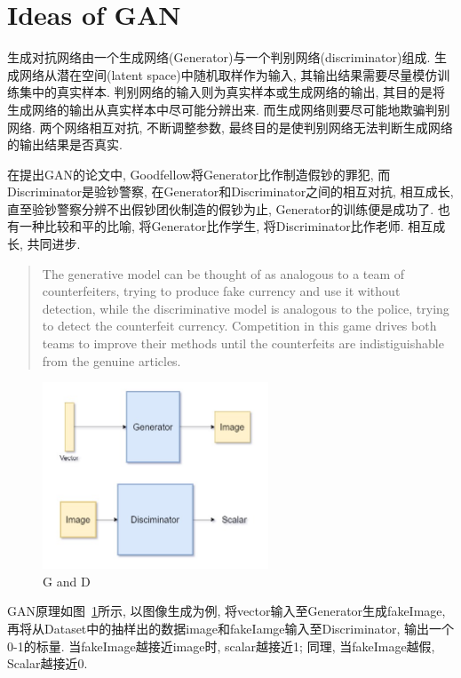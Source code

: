 \section{Ideas of GAN}
生成对抗网络由一个生成网络(Generator)与一个判别网络(discriminator)组成. 生成网络从潜在空间(latent space)中随机取样作为输入, 其输出结果需要尽量模仿训练集中的真实样本. 判别网络的输入则为真实样本或生成网络的输出, 其目的是将生成网络的输出从真实样本中尽可能分辨出来. 而生成网络则要尽可能地欺骗判别网络. 两个网络相互对抗, 不断调整参数, 最终目的是使判别网络无法判断生成网络的输出结果是否真实. 

在提出GAN的论文中, Goodfellow将Generator比作制造假钞的罪犯, 而Discriminator是验钞警察, 在Generator和Discriminator之间的相互对抗, 相互成长, 直至验钞警察分辨不出假钞团伙制造的假钞为止, Generator的训练便是成功了. 也有一种比较和平的比喻, 将Generator比作学生, 将Discriminator比作老师. 相互成长, 共同进步.
\begin{quotation}
    The generative model can be thought of as analogous to a team of counterfeiters, trying to produce fake currency and use it without detection, while the discriminative model is analogous to the police, trying to detect the counterfeit currency. Competition in this game drives both teams to improve their methods until the counterfeits are indistiguishable from the genuine articles.
\end{quotation}

\begin{figure}[!htbp]
    \centering
    \includegraphics[height=15em]{pic/pic0201.jpg}
    \caption{G and D}
    \label{fig:0201}
\end{figure}
GAN原理如图~\ref{fig:0201}所示, 以图像生成为例, 将vector输入至Generator生成fakeImage, 再将从Dataset中的抽样出的数据image和fakeIamge输入至Discriminator, 输出一个0-1的标量. 当fakeImage越接近image时, scalar越接近1; 同理, 当fakeImage越假, Scalar越接近0.

